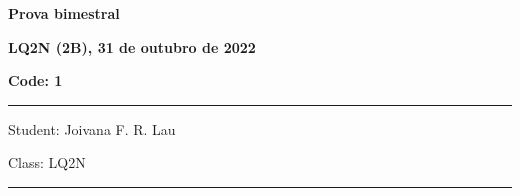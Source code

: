 \documentclass[12pt, addpoints]{exam}
\begin{document}
        \begin{minipage}[b]{0.75\linewidth}
            \begin{flushleft}
                {\bf \large Prova bimestral}
            \end{flushleft}
            \begin{flushleft}
                {\bf \large LQ2N (2B), 31 de outubro de 2022}
            \end{flushleft}
        \end{minipage}
        \begin{minipage}[b]{0.20\linewidth}
            \begin{flushright}
                {\bf \large Code: 1}
            \end{flushright}
        \end{minipage}
        \vspace{0.5cm} \hrule \vspace{0.5cm}
        \begin{minipage}{0.75\linewidth}
            \begin{flushleft}
                Student: Joivana F. R. Lau
            \end{flushleft}
        \end{minipage}
        \begin{minipage}{0.20\linewidth}
            \begin{flushright}
                Class: LQ2N
            \end{flushright}
        \end{minipage}
        \vspace{0.5cm} \hrule \vspace{0.5cm}
\end{document}
